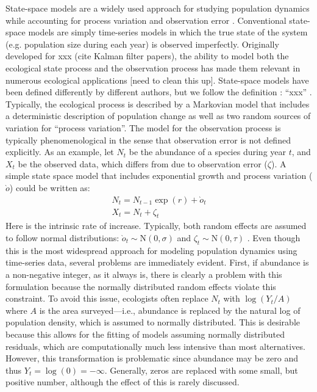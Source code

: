 \documentclass[12pt]{article}
\begin{document}
State-space models are a widely used approach for
studying population dynamics while accounting for process variation
and observation error \citep{devalpine_hastings:2002,
  buckland_etal:2004, dennis_taper:1994,
  dennis_etal:2006}. Conventional state-space models are
simply time-series models in which the true state of the system
(e.g. population size during each year) is
observed imperfectly. Originally developed for xxx (cite Kalman filter
papers), the ability to model both the ecological state process and
the observation process has made them relevant in numerous ecological
applications [need to clean this up]. State-space models have been
defined differently by different authors, but we follow
\citet{buckland_etal:2004} the definition : ``xxx'' . Typically, the
ecological
process is described by a Markovian model that includes a
deterministic description of population change as well as two random
sources of variation for ``process variation''. The model for the
observation process is typically phenomenological in the sense that
observation error is not defined explicitly. As an example, let $N_t$ be
the abundance of a species during year $t$, and $X_t$ be the observed data,
which differs from  due to observation error ($\zeta$). A simple state
space model that includes exponential growth and process variation
($\grave{o}$) could be written as:
\begin{gather}
N_t = N_{t-1}\exp(r)+\grave{o}_t \nonumber \\
X_t = N_t + \zeta_t
\end{gather}
Here   is the intrinsic rate of increase. Typically, both random
effects are assumed to follow normal distributions: $\grave{o}_t \sim
\mathrm{N}(0, \sigma)$ and $\zeta_t \sim \mathrm{N}(0, \tau)$
\citep{devalpine_hastings:2002,dennis_etal:2006}. Even though this is
the most widespread approach for modeling population dynamics using
time-series data, several problems are immediately evident. First, if
abundance is a non-negative integer, as it always is, there is clearly
a problem with this formulation because the normally distributed
random effects violate this constraint. To avoid this issue,
ecologists often replace $N_t$ with $\log(Y_t/A)$   where $A$ is the
area surveyed---i.e.,
abundance is replaced by the natural log of population density, which
is assumed to normally distributed. This is desirable because this
allows for the fitting of models assuming normally distributed
residuals, which are computationally much less intensive than most
alternatives. However, this transformation is problematic since
abundance may be zero and thus $Y_t = \log(0) = -\infty$. Generally,
zeros are replaced with
some small, but positive number, although the effect of this is rarely
discussed.
\end{document}
